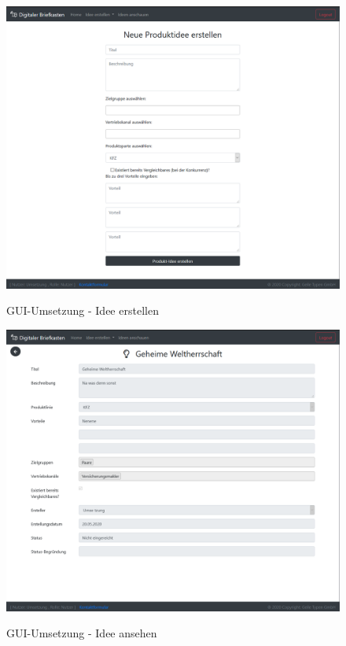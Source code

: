 \begin{figure}[h]
    \centering
    \begin{minipage}[t]{1\textwidth}
        \caption{GUI-Umsetzung - Idee erstellen }
        \includegraphics[width=1\textwidth]{img/createIdea-umsetzung.png}\\
    \end{minipage}
\end{figure}

\begin{figure}[h]
    \centering
    \begin{minipage}[t]{1\textwidth}
        \caption{GUI-Umsetzung - Idee ansehen }
        \includegraphics[width=1\textwidth]{img/idee-umsetzung.png}\\
    \end{minipage}
\end{figure}

